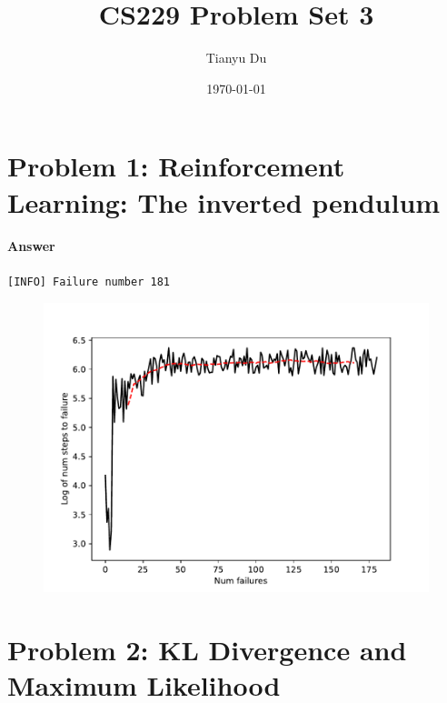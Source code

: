 \documentclass[11pt]{article}
\title{CS229 Problem Set 3}
\date{\today}
\author{Tianyu Du}
\begin{document}
	\maketitle
	\newpage
	\section{Problem 1: Reinforcement Learning: The inverted pendulum}
	
	\paragraph{Answer} \texttt{[INFO] Failure number 181}
	\begin{figure}[H]
		\centering
		\includegraphics[width=\linewidth]{src/cartpole/control.pdf}
	\end{figure}
	
	\newpage
	\section{Problem 2: KL Divergence and Maximum Likelihood}
\end{document}
